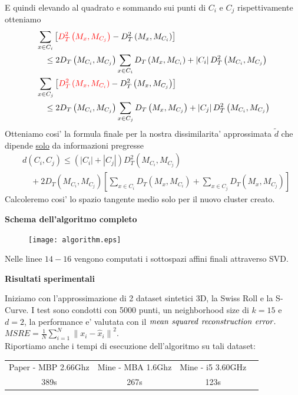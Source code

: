 \documentclass[a4, landscape]{seminar}
\theoremstyle{definition}
\def\bc{\begin{center}}
\def\ec{\end{center}}
\def\bs{\begin{slide}\begingroup\small}
\def\es{\endgroup\end{slide}}
\begin{document}
\bs
E quindi elevando al quadrato e sommando sui punti di $C_i$ e $C_j$ rispettivamente otteniamo
\begin{equation*}
\begin{aligned}
  &\sum_{x \in C_{i}}\left[\textcolor{red}{D_{T}^{2}\left(M_{x}, M_{C_{j}}\right)}-D_{T}^{2}\left(M_{x}, M_{C_{i}}\right)\right] \\
  &\quad \leq 2 D_{T}\left(M_{C_{i}}, M_{C_{j}}\right) \sum_{x \in C_{i}} D_{T}\left(M_{x}, M_{C_{i}}\right)+\left|C_{i}\right| D_{T}^{2}\left(M_{C_{i}}, M_{C_{j}}\right) \\
  &\sum_{x \in C_{j}}\left[\textcolor{red}{D_{T}^{2}\left(M_{x}, M_{C_{i}}\right)}-D_{T}^{2}\left(M_{x}, M_{C_{j}}\right)\right] \\
  &\quad \leq 2 D_{T}\left(M_{C_{i}}, M_{C_{j}}\right) \sum_{x \in C_{j}} D_{T}\left(M_{x}, M_{C_{j}}\right)+\left|C_{j}\right| D_{T}^{2}\left(M_{C_{i}}, M_{C_{j}}\right)
  \end{aligned}
\end{equation*}
Otteniamo cosi' la formula finale per la nostra dissimilarita' approssimata $\tilde{d}$ che dipende \underline{solo}
da informazioni pregresse
\begin{equation*}
  \begin{aligned}
    &d\left(C_{i}, C_{j}\right) \leq\left(\left|C_{i}\right|+\left|C_{j}\right|\right) D_{T}^{2}\left(M_{C_{i}}, M_{C_{j}}\right) \\
    &\quad+2 D_{T}\left(M_{C_{i}}, M_{C_{j}}\right)\left[\sum_{x \in C_{i}} D_{T}\left(M_{x}, M_{C_{i}}\right)+\sum_{x \in C_{j}} D_{T}\left(M_{x}, M_{C_{j}}\right)\right]
  \end{aligned}
\end{equation*}
Calcoleremo cosi' lo spazio tangente medio solo per il nuovo cluster creato.
\es

\bs
\bc{\bf\color{blue}Schema dell'algoritmo completo}\ec
\begin{figure}[b]
\centering
\texttt{[image: algorithm.eps]}
\end{figure}
Nelle linee $14-16$ vengono computati i sottospazi affini finali attraverso SVD.
\es

\bs
\bc{\bf\color{blue}Risultati sperimentali}\ec
Iniziamo con l'approssimazione di 2 dataset sintetici 3D, la Swiss Roll e la S-Curve. I test sono condotti con 5000 punti,
un neighborhood size di $k=15$ e $d=2$, la performance e' valutata con il $\it{mean\ squared\ reconstruction\ error.}$
$M S R E=\frac{1}{N} \sum_{i=1}^{N}\left\|x_{i}-\hat{x}_{i}\right\|^{2}$. \\
Riportiamo anche i tempi di esecuzione dell'algoritmo su tali dataset:
\begin{center}
    \begin{tabular}{ |c|c|c|c| }
    \hline
    Paper - MBP 2.66Ghz & Mine - MBA 1.6Ghz & Mine - i5 3.60GHz \\
    389s & \color[HTML]{009901} 267s & \color[HTML]{009901} 123s \\
    \hline
    \end{tabular}
\end{center}
\es
\end{document}
